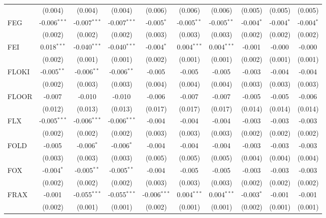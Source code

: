 \begin{table}[!htbp]
\begin{tabular}{@{\extracolsep{5pt}}lccccccccc}
  & (0.004) & (0.004) & (0.004) & (0.006) & (0.006) & (0.006) & (0.005) & (0.005) & (0.005) \\
 FEG & -0.006$^{***}$ & -0.007$^{***}$ & -0.007$^{***}$ & -0.005$^{*}$ & -0.005$^{**}$ & -0.005$^{**}$ & -0.004$^{*}$ & -0.004$^{*}$ & -0.004$^{*}$ \\
  & (0.002) & (0.002) & (0.002) & (0.003) & (0.003) & (0.003) & (0.002) & (0.002) & (0.002) \\
 FEI & 0.018$^{***}$ & -0.040$^{***}$ & -0.040$^{***}$ & -0.004$^{*}$ & 0.004$^{***}$ & 0.004$^{***}$ & -0.001$^{}$ & -0.000$^{}$ & -0.000$^{}$ \\
  & (0.002) & (0.001) & (0.001) & (0.002) & (0.001) & (0.001) & (0.002) & (0.001) & (0.001) \\
 FLOKI & -0.005$^{**}$ & -0.006$^{**}$ & -0.006$^{**}$ & -0.005$^{}$ & -0.005$^{}$ & -0.005$^{}$ & -0.003$^{}$ & -0.004$^{}$ & -0.004$^{}$ \\
  & (0.002) & (0.003) & (0.003) & (0.004) & (0.004) & (0.004) & (0.003) & (0.003) & (0.003) \\
 FLOOR & -0.007$^{}$ & -0.010$^{}$ & -0.010$^{}$ & -0.006$^{}$ & -0.007$^{}$ & -0.007$^{}$ & -0.005$^{}$ & -0.005$^{}$ & -0.006$^{}$ \\
  & (0.012) & (0.013) & (0.013) & (0.017) & (0.017) & (0.017) & (0.014) & (0.014) & (0.014) \\
 FLX & -0.005$^{***}$ & -0.006$^{***}$ & -0.006$^{***}$ & -0.004$^{}$ & -0.004$^{}$ & -0.004$^{}$ & -0.003$^{}$ & -0.003$^{}$ & -0.003$^{}$ \\
  & (0.002) & (0.002) & (0.002) & (0.003) & (0.003) & (0.003) & (0.002) & (0.002) & (0.002) \\
 FOLD & -0.005$^{}$ & -0.006$^{*}$ & -0.006$^{*}$ & -0.004$^{}$ & -0.004$^{}$ & -0.004$^{}$ & -0.003$^{}$ & -0.003$^{}$ & -0.003$^{}$ \\
  & (0.003) & (0.003) & (0.003) & (0.005) & (0.005) & (0.005) & (0.004) & (0.004) & (0.004) \\
 FOX & -0.004$^{*}$ & -0.005$^{**}$ & -0.005$^{**}$ & -0.004$^{}$ & -0.005$^{}$ & -0.005$^{}$ & -0.003$^{}$ & -0.003$^{}$ & -0.003$^{}$ \\
  & (0.002) & (0.002) & (0.002) & (0.003) & (0.003) & (0.003) & (0.002) & (0.002) & (0.002) \\
 FRAX & -0.001$^{}$ & -0.055$^{***}$ & -0.055$^{***}$ & -0.006$^{***}$ & 0.004$^{***}$ & 0.004$^{***}$ & -0.003$^{*}$ & -0.001$^{}$ & -0.001$^{}$ \\
  & (0.002) & (0.001) & (0.001) & (0.002) & (0.001) & (0.001) & (0.002) & (0.001) & (0.001) \\

\end{tabular}
\end{table}
